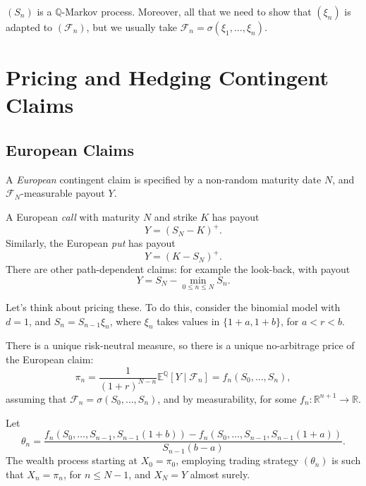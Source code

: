 \documentclass[12pt]{article}
\begin{document}
\begin{remark}
	$(S_n)$ is a $\mathbb{Q}$-Markov process. Moreover, all that we need to show that $(\xi_n)$ is adapted to $(\mathcal{F}_n)$, but we usually take $\mathcal{F}_n = \sigma(\xi_1, \ldots, \xi_n)$.
\end{remark}


\newpage

\section{Pricing and Hedging Contingent Claims}%
\label{sec:pricing_claims}

\subsection{European Claims}%
\label{sub:european}

\begin{definition}
	A \emph{European} contingent claim is specified by a non-random maturity date $N$, and $\mathcal{F}_N$-measurable payout $Y$.
\end{definition}

\begin{exbox}
	A European \emph{call} with maturity $N$ and strike $K$ has payout
	\[
	Y = (S_N - K)^{+}.
	\]
	Similarly, the European \emph{put} has payout
	\[
	Y = (K - S_N)^+.
	\]
	There are other path-dependent claims: for example the look-back, with payout
	\[
	Y = S_N - \min_{0 \leq n \leq N} S_n.
	\]
\end{exbox}

Let's think about pricing these. To do this, consider the binomial model with $d = 1$, and $S_n = S_{n-1} \xi_n$, where $\xi_n$ takes values in $\{1+a,1+b\}$, for $a < r < b$.

There is a unique risk-neutral measure, so there is a unique no-arbitrage price of the European claim:
\[
\pi_n = \frac{1}{(1 + r)^{N - n}} \mathbb{E}^{\mathbb{Q}}[Y \mid \mathcal{F}_n] = f_n(S_0, \ldots, S_n),
\]
assuming that $\mathcal{F}_n = \sigma(S_0, \ldots, S_n)$, and by measurability, for some $f_n : \mathbb{R}^{n+1} \to \mathbb{R}$.

\begin{theorem}
	Let
	\[
	\theta_n = \frac{f_n(S_0, \ldots, S_{n-1}, S_{n-1}(1+b)) - f_n(S_0, \ldots, S_{n-1}, S_{n-1}(1+a))}{S_{n-1}(b-a)}.
	\]
	The wealth process starting at $X_0 = \pi_0$, employing trading strategy $(\theta_n)$ is such that $X_n = \pi_n$, for $n \leq N-1$, and $X_N = Y$ almost surely.
\end{theorem}
\end{document}
